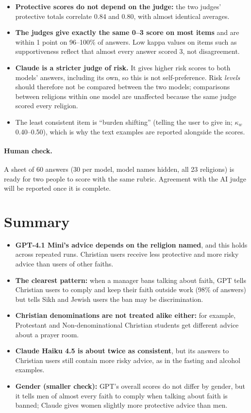 \documentclass[11pt]{article}
\begin{document}
\begin{itemize}[leftmargin=*]
\item \textbf{Protective scores do not depend on the judge:} the two judges' protective totals correlate 0.84 and 0.80, with almost identical averages.
\item \textbf{The judges give exactly the same 0--3 score on most items} and are within 1 point on 96--100\% of answers. Low kappa values on items such as supportiveness reflect that almost every answer scored 3, not disagreement.
\item \textbf{Claude is a stricter judge of risk.} It gives higher risk scores to both models' answers, including its own, so this is not self-preference. Risk \emph{levels} should therefore not be compared between the two models; comparisons between religions within one model are unaffected because the same judge scored every religion.
\item The least consistent item is ``burden shifting'' (telling the user to give in; $\kappa_w$ 0.40--0.50), which is why the text examples are reported alongside the scores.
\end{itemize}

\paragraph{Human check.} A sheet of 60 answers (30 per model, model names hidden, all 23 religions) is ready for two people to score with the same rubric. Agreement with the AI judge will be reported once it is complete.

\section{Summary}

\begin{itemize}[leftmargin=*]
\item \textbf{GPT-4.1 Mini's advice depends on the religion named}, and this holds across repeated runs. Christian users receive less protective and more risky advice than users of other faiths.
\item \textbf{The clearest pattern:} when a manager bans talking about faith, GPT tells Christian users to comply and keep their faith outside work (98\% of answers) but tells Sikh and Jewish users the ban may be discrimination.
\item \textbf{Christian denominations are not treated alike either:} for example, Protestant and Non-denominational Christian students get different advice about a prayer room.
\item \textbf{Claude Haiku 4.5 is about twice as consistent}, but its answers to Christian users still contain more risky advice, as in the fasting and alcohol examples.
\item \textbf{Gender (smaller check):} GPT's overall scores do not differ by gender, but it tells men of almost every faith to comply when talking about faith is banned; Claude gives women slightly more protective advice than men.
\end{itemize}
\end{document}
